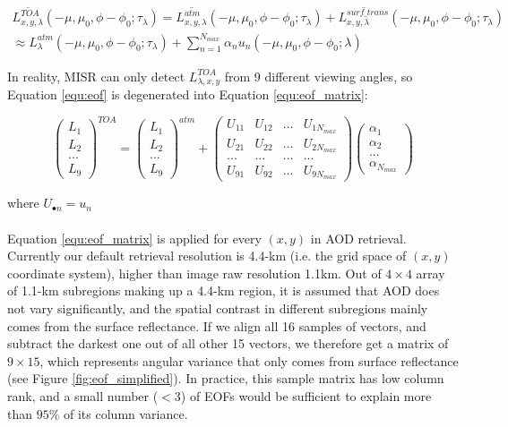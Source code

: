 \begin{multline}
\label{equ:eof}
\overline{L^{TOA}_{x,y,\lambda}}(-\mu,\mu_0,\phi-\phi_0;\tau_\lambda) = \overline{L^{atm}_{x,y,\lambda}}(-\mu,\mu_0,\phi-\phi_0;\tau_\lambda) + \overline{L^{surf\_trans}_{x,y,\lambda}}(-\mu,\mu_0,\phi-\phi_0;\tau_\lambda) \\ \approx L^{atm}_{\lambda}(-\mu,\mu_0,\phi-\phi_0;\tau_\lambda)  + \sum\limits_{n=1}^{N_{max}} \alpha_n u_n(-\mu,\mu_0,\phi-\phi_0;\lambda)
\end{multline}

In reality, MISR can only detect $L^{TOA}_{\lambda,x,y}$ from 9 different viewing angles, so Equation \eqref{equ:eof} is degenerated into Equation \eqref{equ:eof_matrix}:

\begin{equation}
\label{equ:eof_matrix}
\begin{pmatrix} L_1 \\ L_2 \\ ... \\L_9 \end{pmatrix} ^{TOA} = \begin{pmatrix} L_1 \\ L_2 \\ ... \\L_9 \end{pmatrix} ^{atm} + \begin{pmatrix} U_{11} & U_{12} & ... & U_{1N_{max}}\\U_{21} & U_{22} & ... & U_{2N_{max}} \\ ... & ... & ... & ... \\U_{91} & U_{92} & ... & U_{9N_{max}} \end{pmatrix} \begin{pmatrix} \alpha_1 \\ \alpha_2 \\ ... \\ \alpha_{N_{max}} \end{pmatrix}
\end{equation}

where $U_{\bullet n} = u_n$\\
\\
Equation \eqref{equ:eof_matrix} is applied for every $(x,y)$ in AOD retrieval. Currently our default retrieval resolution is 4.4-km (i.e. the grid space of $(x,y)$ coordinate system), higher than image raw resolution 1.1km. Out of $4\times4$ array of 1.1-km subregions making up a 4.4-km region, it is assumed that AOD does not vary significantly, and the spatial contrast in different subregions mainly comes from the surface reflectance. If we align all 16 samples of vectors, and subtract the darkest one out of all other 15 vectors, we therefore get a matrix of $9\times15$, which represents angular variance that only comes from surface reflectance (see Figure \ref{fig:eof_simplified}). In practice, this sample matrix has low column rank, and a small number ($<3$) of EOFs would be sufficient to explain more than $95\%$ of its column variance.

